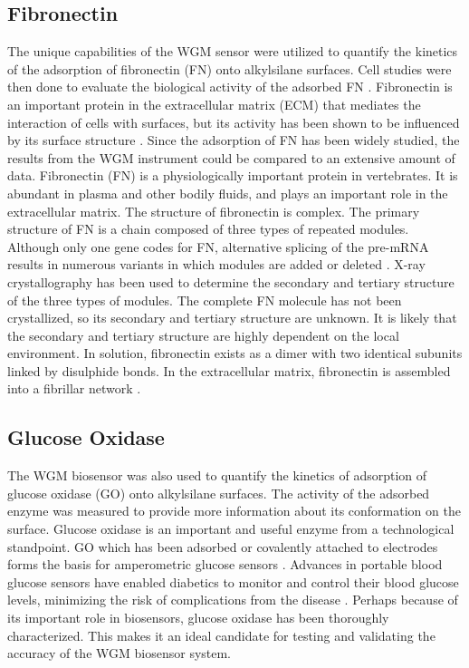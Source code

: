 \subsection{Fibronectin}

The unique capabilities of the WGM sensor were utilized to quantify
the kinetics of the adsorption of fibronectin (FN) onto alkylsilane
surfaces. Cell studies were then done to evaluate the biological activity
of the adsorbed FN \cite{Keselowsky2004}. Fibronectin is an important
protein in the extracellular matrix (ECM) that mediates the interaction
of cells with surfaces, but its activity has been shown to be influenced
by its surface structure \cite{Lan2005,Michael2003}. Since the adsorption
of FN has been widely studied, the results from the WGM instrument
could be compared to an extensive amount of data. Fibronectin (FN)
is a physiologically important protein in vertebrates. It is abundant
in plasma and other bodily fluids, and plays an important role in
the extracellular matrix. The structure of fibronectin is complex.
The primary structure of FN is a chain composed of three types of
repeated modules. Although only one gene codes for FN, alternative
splicing of the pre-mRNA results in numerous variants in which modules
are added or deleted \cite{Pankov2002}. X-ray crystallography has
been used to determine the secondary and tertiary structure of the
three types of modules. The complete FN molecule has not been crystallized,
so its secondary and tertiary structure are unknown. It is likely
that the secondary and tertiary structure are highly dependent on
the local environment. In solution, fibronectin exists as a dimer
with two identical subunits linked by disulphide bonds. In the extracellular
matrix, fibronectin is assembled into a fibrillar network \cite{Mao2005}.


\subsection{Glucose Oxidase}

The WGM biosensor was also used to quantify the kinetics of adsorption
of glucose oxidase (GO) onto alkylsilane surfaces. The activity of
the adsorbed enzyme was measured to provide more information about
its conformation on the surface. Glucose oxidase is an important and
useful enzyme from a technological standpoint. GO which has been adsorbed
or covalently attached to electrodes forms the basis for amperometric
glucose sensors \cite{Wang2007}. Advances in portable blood glucose
sensors have enabled diabetics to monitor and control their blood
glucose levels, minimizing the risk of complications from the disease
\cite{Oliver2009}. Perhaps because of its important role in biosensors,
glucose oxidase has been thoroughly characterized. This makes it an
ideal candidate for testing and validating the accuracy of the WGM
biosensor system. 

